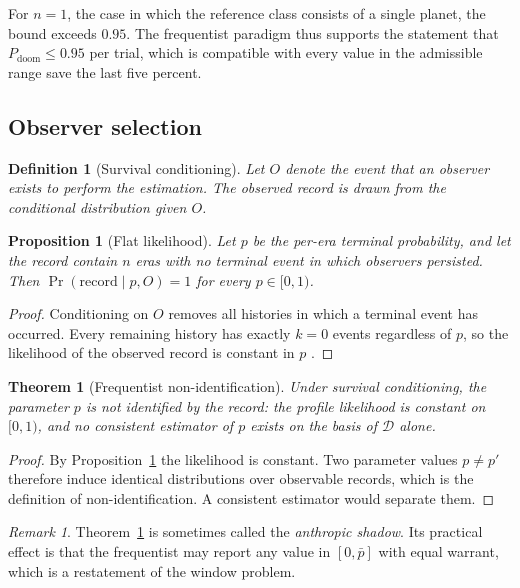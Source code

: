 \documentclass[11pt]{article}
\newtheorem{definition}{Definition}[section]
\newtheorem{proposition}{Proposition}[section]
\newtheorem{theorem}{Theorem}[section]
\theoremstyle{remark}
\newtheorem{remark}{Remark}[section]
\newcommand{\PD}{P_{\mathrm{doom}}}
\begin{document}
For $n=1$, the case in which the reference class consists of a single planet, the bound exceeds $0.95$. The frequentist paradigm thus supports the statement that $\PD\le 0.95$ per trial, which is compatible with every value in the admissible range save the last five percent.

\subsection{Observer selection}

\begin{definition}[Survival conditioning]\label{def:survival}
Let $O$ denote the event that an observer exists to perform the estimation. The observed record is drawn from the conditional distribution given $O$.
\end{definition}

\begin{proposition}[Flat likelihood]\label{prop:flat}
Let $p$ be the per-era terminal probability, and let the record contain $n$ eras with no terminal event in which observers persisted. Then $\Pr(\text{record}\mid p,O)=1$ for every $p\in[0,1)$.
\end{proposition}
\begin{proof}
Conditioning on $O$ removes all histories in which a terminal event has occurred. Every remaining history has exactly $k=0$ events regardless of $p$, so the likelihood of the observed record is constant in $p$ \cite{cirkovic2010,bostrom2002}. \qedhere
\end{proof}

\begin{theorem}[Frequentist non-identification]\label{thm:freq}
Under survival conditioning, the parameter $p$ is not identified by the record: the profile likelihood is constant on $[0,1)$, and no consistent estimator of $p$ exists on the basis of $\mathcal{D}$ alone.
\end{theorem}
\begin{proof}
By Proposition~\ref{prop:flat} the likelihood is constant. Two parameter values $p\neq p'$ therefore induce identical distributions over observable records, which is the definition of non-identification. A consistent estimator would separate them. \qedhere
\end{proof}

\begin{remark}
Theorem~\ref{thm:freq} is sometimes called the \emph{anthropic shadow}. Its practical effect is that the frequentist may report any value in $[0,\bar p]$ with equal warrant, which is a restatement of the window problem.
\end{remark}
\end{document}
